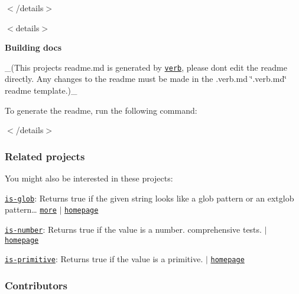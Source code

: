 $<$/details$>$

$<$details$>$ 

{\bfseries Building docs}

\+\_\+(This project\textquotesingle{}s readme.\+md is generated by \href{https://github.com/verbose/verb-generate-readme}{\tt verb}, please don\textquotesingle{}t edit the readme directly. Any changes to the readme must be made in the .verb.\+md \char`\"{}.\+verb.\+md\char`\"{} readme template.)\+\_\+

To generate the readme, run the following command\+:




$<$/details$>$

\subsubsection*{Related projects}

You might also be interested in these projects\+:


\begin{DoxyItemize}
\item \href{https://www.npmjs.com/package/is-glob}{\tt is-\/glob}\+: Returns {\ttfamily true} if the given string looks like a glob pattern or an extglob pattern… \href{https://github.com/jonschlinkert/is-glob}{\tt more} $\vert$ \href{https://github.com/jonschlinkert/is-glob}{\tt homepage}
\item \href{https://www.npmjs.com/package/is-number}{\tt is-\/number}\+: Returns true if the value is a number. comprehensive tests. $\vert$ \href{https://github.com/jonschlinkert/is-number}{\tt homepage}
\item \href{https://www.npmjs.com/package/is-primitive}{\tt is-\/primitive}\+: Returns {\ttfamily true} if the value is a primitive. $\vert$ \href{https://github.com/jonschlinkert/is-primitive}{\tt homepage}
\end{DoxyItemize}

\subsubsection*{Contributors}

